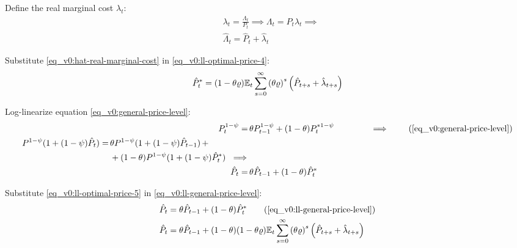 \documentclass[../thesis.tex]{subfiles}
\begin{document}
	Define the real marginal cost $\lambda_t$:
	\begin{align}
		& \lambda_t = \frac{\Lambda_t}{P_t} \implies \Lambda_t = P_t \lambda_t \implies \nonumber \\
		& \hat{\Lambda}_t = \hat{P}_t + \hat{\lambda}_t \label{eq_v0:hat-real-marginal-cost}
	\end{align}
	
	Substitute \ref{eq_v0:hat-real-marginal-cost} in \ref{eq_v0:ll-optimal-price-4}:
	\begin{align}
		\hat{P}_t^\ast = (1- \theta \varrho) {\mathbb{E}_{t}} \sum_{s=0}^{\infty} \left( \theta \varrho \right)^s \left( \hat{P}_{t+s} + \hat{\lambda}_{t+s} \right) \label{eq_v0:ll-optimal-price-5}
	\end{align}
	
	Log-linearize equation \ref{eq_v0:general-price-level}:
	\begin{align}
		P_t^{1-\psi} =\, &\theta P_{t-1}^{1-\psi} + (1-\theta) P_t^{\ast 1-\psi} \qquad \qquad \implies \tag{\ref{eq_v0:general-price-level}} \\
		\begin{split} P^{1-\psi} (1 + (1-\psi)\hat{P}_t) =\, &\theta P^{1-\psi} (1 + (1-\psi)\hat{P}_{t-1}) \, + \\ & + (1-\theta) P^{1-\psi} (1 + (1-\psi)\hat{P}_t^\ast) \ \implies \nonumber \end{split} \\
		\hat{P}_t =\, &\theta \hat{P}_{t-1} + (1-\theta) \hat{P}_t^\ast
		\label{eq_v0:ll-general-price-level}
	\end{align}
	
	Substitute \ref{eq_v0:ll-optimal-price-5} in \ref{eq_v0:ll-general-price-level}:
	\begin{align}
		\hat{P}_t &= \theta \hat{P}_{t-1} + (1-\theta) \hat{P}_t^\ast \tag{\ref{eq_v0:ll-general-price-level}}\\
		\hat{P}_t &= \theta \hat{P}_{t-1} + (1-\theta) (1- \theta \varrho) \E \sum_{s=0}^{\infty} \left( \theta \varrho \right)^s \left( \hat{P}_{t+s} + \hat{\lambda}_{t+s} \right) \label{eq_v0:ll-general-price-level-2}
	\end{align}
	
\end{document}
